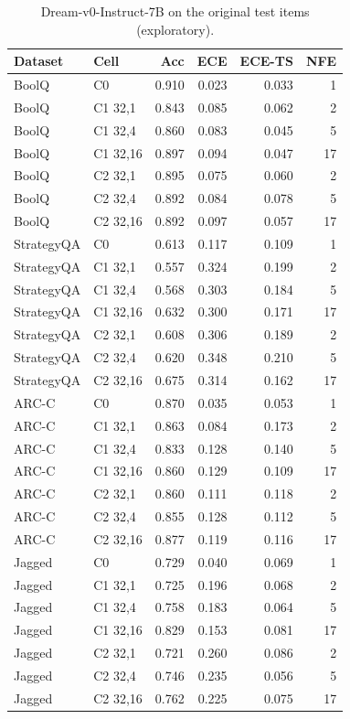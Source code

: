 \begin{table}[h!]
\centering
\scriptsize
\caption{Dream-v0-Instruct-7B on the original test items (exploratory).}
\label{tab:dream}
\begin{tabular}{llrrrr}
\toprule
Dataset & Cell & Acc & ECE & ECE-TS & NFE \\
\midrule
BoolQ & C0 & 0.910 & 0.023 & 0.033 & 1 \\
BoolQ & C1 32,1 & 0.843 & 0.085 & 0.062 & 2 \\
BoolQ & C1 32,4 & 0.860 & 0.083 & 0.045 & 5 \\
BoolQ & C1 32,16 & 0.897 & 0.094 & 0.047 & 17 \\
BoolQ & C2 32,1 & 0.895 & 0.075 & 0.060 & 2 \\
BoolQ & C2 32,4 & 0.892 & 0.084 & 0.078 & 5 \\
BoolQ & C2 32,16 & 0.892 & 0.097 & 0.057 & 17 \\
StrategyQA & C0 & 0.613 & 0.117 & 0.109 & 1 \\
StrategyQA & C1 32,1 & 0.557 & 0.324 & 0.199 & 2 \\
StrategyQA & C1 32,4 & 0.568 & 0.303 & 0.184 & 5 \\
StrategyQA & C1 32,16 & 0.632 & 0.300 & 0.171 & 17 \\
StrategyQA & C2 32,1 & 0.608 & 0.306 & 0.189 & 2 \\
StrategyQA & C2 32,4 & 0.620 & 0.348 & 0.210 & 5 \\
StrategyQA & C2 32,16 & 0.675 & 0.314 & 0.162 & 17 \\
ARC-C & C0 & 0.870 & 0.035 & 0.053 & 1 \\
ARC-C & C1 32,1 & 0.863 & 0.084 & 0.173 & 2 \\
ARC-C & C1 32,4 & 0.833 & 0.128 & 0.140 & 5 \\
ARC-C & C1 32,16 & 0.860 & 0.129 & 0.109 & 17 \\
ARC-C & C2 32,1 & 0.860 & 0.111 & 0.118 & 2 \\
ARC-C & C2 32,4 & 0.855 & 0.128 & 0.112 & 5 \\
ARC-C & C2 32,16 & 0.877 & 0.119 & 0.116 & 17 \\
Jagged & C0 & 0.729 & 0.040 & 0.069 & 1 \\
Jagged & C1 32,1 & 0.725 & 0.196 & 0.068 & 2 \\
Jagged & C1 32,4 & 0.758 & 0.183 & 0.064 & 5 \\
Jagged & C1 32,16 & 0.829 & 0.153 & 0.081 & 17 \\
Jagged & C2 32,1 & 0.721 & 0.260 & 0.086 & 2 \\
Jagged & C2 32,4 & 0.746 & 0.235 & 0.056 & 5 \\
Jagged & C2 32,16 & 0.762 & 0.225 & 0.075 & 17 \\
\bottomrule
\end{tabular}
\end{table}
